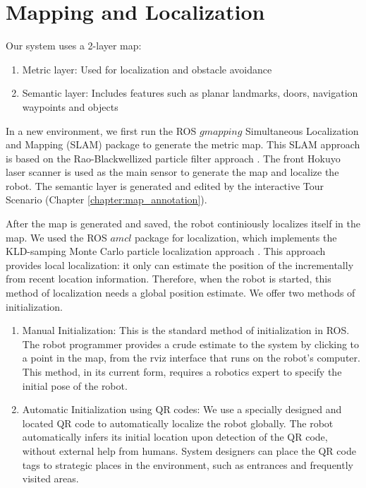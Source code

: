 \section{Mapping and Localization}
\label{sec:mapping_localization}

Our system uses a 2-layer map:

\begin{enumerate}
\item Metric layer: Used for localization and obstacle avoidance
\item Semantic layer: Includes features such as planar landmarks, doors, navigation waypoints and objects
\end{enumerate}

In a new environment, we first run the ROS $gmapping$ Simultaneous Localization and Mapping (SLAM) package to generate the metric map. This SLAM approach is based on the Rao-Blackwellized particle filter approach \cite{grisetti2007improved}. The front Hokuyo laser scanner is used as the main sensor to generate the map and localize the robot. The semantic layer is generated and edited by the interactive Tour Scenario (Chapter \ref{chapter:map_annotation}).

After the map is generated and saved, the robot continiously localizes itself in the map. We used the ROS $amcl$ package for localization, which implements the KLD-samping Monte Carlo particle localization approach \cite{fox1999monte}. This approach provides local localization: it only can estimate the position of the incrementally from recent location information. Therefore, when the robot is started, this method of localization needs a global position estimate. We offer two methods of initialization.

\begin{enumerate}
\item Manual Initialization: This is the standard method of initialization in ROS. The robot programmer provides a crude estimate to the system by clicking to a point in the map, from the rviz interface that runs on the robot's computer. This method, in its current form, requires a robotics expert to specify the initial pose of the robot.
\item Automatic Initialization using QR codes: We use a specially designed and located QR code to automatically localize the robot globally. The robot automatically infers its initial location upon detection of the QR code, without external help from humans. System designers can place the QR code tags to strategic places in the environment, such as entrances and frequently visited areas. 
\end{enumerate}

